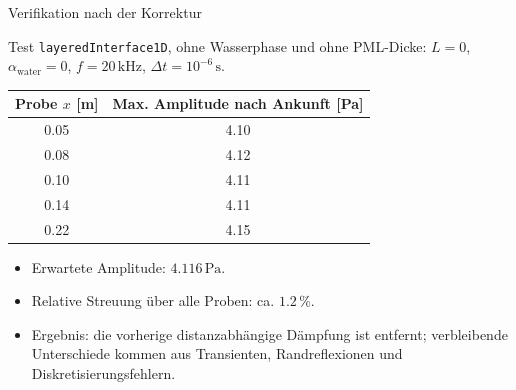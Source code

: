 \documentclass[
	german,%
	accentcolor=9c,%
	accept-missing-logos=true,%
]{tudabeamer}
\newcommand*{\code}[1]{\texttt{#1}}
\begin{document}
\begin{frame}{Verifikation nach der Korrektur}
    \scriptsize
    \setlength{\abovedisplayskip}{0.04cm}
    \setlength{\belowdisplayskip}{0.04cm}
    \begin{block}{Test}
        \code{layeredInterface1D}, ohne Wasserphase und ohne PML-Dicke:
        $L=0$, $\alpha_\mathrm{water}=0$, $f=20\,\mathrm{kHz}$,
        $\Delta t=10^{-6}\,\mathrm{s}$.
    \end{block}

    \begin{center}
    \begin{tabular}{cc}
        \toprule
        Probe $x$ [m] & Max. Amplitude nach Ankunft [Pa]\\
        \midrule
        0.05 & 4.10\\
        0.08 & 4.12\\
        0.10 & 4.11\\
        0.14 & 4.11\\
        0.22 & 4.15\\
        \bottomrule
    \end{tabular}
    \end{center}

    \begin{itemize}
        \setlength{\itemsep}{0.05cm}
        \item Erwartete Amplitude: $4.116\,\mathrm{Pa}$.
        \item Relative Streuung über alle Proben: ca. $1.2\,\%$.
        \item Ergebnis: die vorherige distanzabhängige Dämpfung ist entfernt;
        verbleibende Unterschiede kommen aus Transienten, Randreflexionen und
        Diskretisierungsfehlern.
    \end{itemize}
\end{frame}


\end{document}
